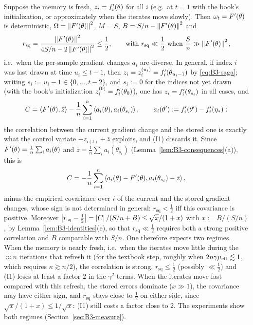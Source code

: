 \begin{remark}\label{rem:B3-fresh}
Suppose the memory is fresh, $z_i=f'_i(\theta)$ for all $i$ (e.g.\ at $t=1$ with the book's initialization, or approximately when the iterates move slowly). Then $\omega_t=F'(\theta)$ is deterministic, $\Omega=\left\|F'(\theta)\right\|^2$, $M=S$, $B=S/n-\left\|F'(\theta)\right\|^2$ and
\[
r_{\mathrm{sq}}=\frac{\left\|F'(\theta)\right\|^2}{4S/n-2\left\|F'(\theta)\right\|^2}\le\frac12,\qquad\text{with }r_{\mathrm{sq}}\ll\frac12\text{ when }\frac Sn\gg\left\|F'(\theta)\right\|^2,
\]
i.e.\ when the per-sample gradient changes $a_i$ are diverse. In general, if index $i$ was last drawn at time $u_i\le t-1$, then $z_i=z^{(u_i)}_i=f'_i(\theta_{u_i-1})$ by \eqref{eq:B3-saga}; writing $s_i:=u_i-1\in\{0,\dots,t-2\}$, and $s_i:=0$ for the indices not yet drawn (with the book's initialization $z^{(0)}_i=f'_i(\theta_0)$), one has $z_i=f'_i(\theta_{s_i})$ in all cases, and
\[
C=\left\langle F'(\theta), \bar z \right\rangle-\frac1n\sum_{i=1}^n\left\langle a_i(\theta), a_i(\theta_{s_i}) \right\rangle,\qquad a_i(\theta'):=f'_i(\theta')-f'_i(\eta_\ast):
\]
the correlation between the current gradient change and the stored one is exactly what the control variate $-z_{i(t)}+\bar z$ exploits, and (I1) discards it. Since $F'(\theta)=\frac1n\sum_ia_i(\theta)$ and $\bar z=\frac1n\sum_ia_i(\theta_{s_i})$ (Lemma~\ref{lem:B3-consequences}(a)), this is
\[
C=-\frac1n\sum_{i=1}^n\left\langle a_i(\theta)-F'(\theta), a_i(\theta_{s_i})-\bar z \right\rangle,
\]
minus the empirical covariance over $i$ of the current and the stored gradient changes, whose sign is not determined in general: $r_{\mathrm{sq}}<\frac12$ iff this covariance is positive. Moreover $\left|r_{\mathrm{sq}}-\frac12\right|=\left|C\right|/(S/n+B)\le\sqrt x/(1+x)$ with $x:=B/(S/n)$, by Lemma~\ref{lem:B3-identities}(e), so that $r_{\mathrm{sq}}\ll\frac12$ requires both a strong positive correlation and $B$ comparable with $S/n$. One therefore expects two regimes. When the memory is nearly fresh, i.e.\ when the iterates move little during the $\approx n$ iterations that refresh it (for the textbook step, roughly when $2n\gamma\mu_{\mathrm{eff}}\lesssim1$, which requires $\kappa\gtrsim n/2$), the correlation is strong, $r_{\mathrm{sq}}\le\frac12$ (possibly $\ll\frac12$) and (I1) loses at least a factor $2$ in the $\gamma^2$ terms. When the iterates move fast compared with this refresh, the stored errors dominate ($x\gg1$), the covariance may have either sign, and $r_{\mathrm{sq}}$ stays close to $\frac12$ on either side, since $\sqrt x/(1+x)\le1/\sqrt x$: (I1) still costs a factor close to $2$. The experiments show both regimes (Section~\ref{sec:B3-measure}).
\end{remark}

